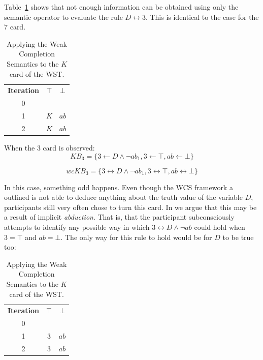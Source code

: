 \documentclass[
11pt, %
english, %
singlespacing, %
headsepline, %
]{MastersDoctoralThesis} %
\begin{document}
Table~\ref{tbl:kcard} shows that not enough information can be obtained using only the semantic operator to evaluate the rule $D \leftrightarrow 3$. This is identical to the case for the $7$ card.

\begin{table}
\begin{center}

\begin{tabular}{ c c c }
 \textbf{Iteration} & \textbf{$\top$} & \textbf{$\bot$} \\ 
 0 &  &  \\  
 1 &  $K$ & $ab$  \\  
 2 &  $K$ & $ab$  
\end{tabular}
\caption{Applying the Weak Completion Semantics to the $K$ card of the WST.}
\label{tbl:kcard}

\end{center}
\end{table}

When the $3$ card is observed:
\[
KB_3 = \{3 \leftarrow D \land \lnot ab_1, 3 \leftarrow \top, ab \leftarrow \bot \}
\]

\[
wcKB_3 = \{3 \leftrightarrow D \land \lnot ab_1, 3 \leftrightarrow \top, ab \leftrightarrow \bot \}
\]

In this case, something odd happens. Even though the WCS framework a outlined is not able to deduce anything about the truth value of the variable $D$, participants still very often chose to turn this card. In \cite{breu2019weak} we argue that this may be a result of implicit \textit{abduction}. That is, that the participant subconsciously attempts to identify any possible way in which $3 \leftrightarrow D \land \lnot ab$ could hold when $3=\top$ and $ab=\bot$. The only way for this rule to hold would be for $D$ to be true too:

\begin{table}
\begin{center}

\begin{tabular}{ c c c }
 \textbf{Iteration} & \textbf{$\top$} & \textbf{$\bot$} \\ 
 0 &  &  \\  
 1 &  $3$ & $ab$  \\  
 2 &  $3$ & $ab$  
\end{tabular}
\caption{Applying the Weak Completion Semantics to the $K$ card of the WST.}
\label{tbl:3card}

\end{center}
\end{table}
\end{document}
